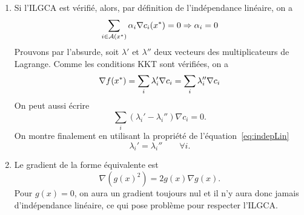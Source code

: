 \begin{enumerate}
  \begin{solution}
    \begin{enumerate}
      \item Si l'ILGCA est vérifié, alors, 
      par définition de l'indépendance linéaire, on a
      \begin{equation} 
        \sum_{i \in \mathcal{A}(x^*)}{\alpha_i \nabla c_i (x^*)} = 0
        \Rightarrow \alpha_i = 0 
        \label{eq:indepLin}
      \end{equation}
      Prouvons par l'absurde,
      soit $\lambda'$ et $\lambda''$ deux vecteurs des multiplicateurs de
      Lagrange.
      Comme les conditions KKT sont vérifiées, on a
      \[ 
        \nabla f(x^*) = \sum_i \lambda_i' \nabla c_i = \sum_i \lambda_i'' \nabla c_i
      \]
      On peut aussi écrire 
      \[ \sum_i (\lambda_i' - \lambda_i'') \nabla c_i = 0. \]
      On montre finalement en utilisant la propriété de l'équation~\ref{eq:indepLin}
      \[ \lambda_i' = \lambda_i'' \qquad \forall i. \] 
      
      \item Le gradient de la forme équivalente est
      \[ \nabla (g(x)^2) = 2 g(x) \nabla g(x). \]
      Pour $g(x)=0$, on aura un gradient toujours nul
      et il n'y aura donc jamais d'indépendance linéaire,
      ce qui pose problème pour respecter l'ILGCA.
    \end{enumerate}
  \end{solution}
  
\end{enumerate}